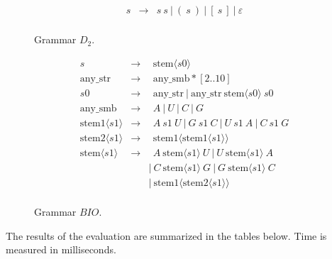 \vspace{-5pt}
\begin{figure}
\centering
\begin{minipage}{0.5\textwidth}
	\[
	\begin{array}{ccl}
	s & \rightarrow & s \ s \ | \ ( \ s \ ) \ | \ [ \ s \ ] \ | \ \varepsilon \\
	\end{array}
	\]
	\caption{Grammar $D_2$.}
	\label{d2}
\end{minipage}
\hfill
\begin{minipage}{0.5\textwidth}
	\[
	\begin{array}{ccl}
            s & \rightarrow & \ \ \text{stem}\langle s0 \rangle \\
            \text{any\_str} & \rightarrow & \ \ \text{any\_smb}*[2..10] \\
            s0 & \rightarrow & \ \ \text{any\_str} \ | \ \text{any\_str} \ \text{stem}\langle s0 \rangle \ s0 \\
            \text{any\_smb} & \rightarrow &  \ \ A \ | \ U \ | \ C \ | \  G \\
            \text{stem1}\langle s1 \rangle & \rightarrow & \ \ A \ s1 \  U \ | \ G \ s1 \ C \ | \ U \ s1 \ A \ | \ C \ s1 \ G \\
            \text{stem2}\langle s1 \rangle & \rightarrow & \ \ \text{stem1}\langle \text{stem1}\langle s1 \rangle \rangle \\
            \text{stem}\langle s1 \rangle & \rightarrow & \ \ A \ \text{stem}\langle s1 \rangle \ U
              \ | \ U \ \text{stem}\langle s1 \rangle \ A \\
              & &    | \ C \ \text{stem}\langle s1 \rangle \ G
              \ | \ G \ \text{stem}\langle s1 \rangle \ C \\
              & &    | \ \text{stem1}\langle \text{stem2}\langle s1 \rangle \rangle \\
    \end{array}
	\]
	\caption{Grammar $BIO$.}
	\label{bio}
\end{minipage}
\end{figure}

\vspace{-5pt}
The results of the evaluation are summarized in the tables below.
Time is measured in milliseconds.

